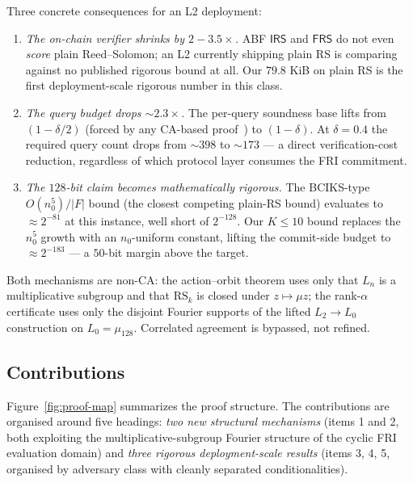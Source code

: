 \documentclass[11pt]{article}
\theoremstyle{definition}
\theoremstyle{remark}
\newcommand{\RS}{\mathrm{RS}}
\begin{document}
Three concrete consequences for an L2 deployment:
\begin{enumerate}[label=(\roman*), leftmargin=2em, nosep]
\item \emph{The on-chain verifier shrinks by $2{-}3.5\times$.} ABF
$\mathsf{IRS}$ and $\mathsf{FRS}$ do not even \emph{score} plain
Reed--Solomon; an L2 currently shipping plain RS is comparing against
no published rigorous bound at all. Our $79.8$ KiB on plain RS is the
first deployment-scale rigorous number in this class.
\item \emph{The query budget drops $\sim 2.3\times$.} The per-query
soundness base lifts from $(1{-}\delta/2)$ (forced by any CA-based
proof~\cite{Paper1}) to $(1{-}\delta)$. At $\delta = 0.4$ the required
query count drops from ${\sim}398$ to ${\sim}173$ --- a direct
verification-cost reduction, regardless of which protocol layer
consumes the FRI commitment.
\item \emph{The $128$-bit claim becomes mathematically rigorous.} The
BCIKS-type $O(n_0^5)/|F|$ bound (the closest competing plain-RS
bound) evaluates to $\approx 2^{-81}$ at this instance, well short of
$2^{-128}$. Our $K \leq 10$ bound replaces the $n_0^5$ growth with an
$n_0$-uniform constant, lifting the commit-side budget to
$\approx 2^{-183}$ --- a $50$-bit margin above the target.
\end{enumerate}

Both mechanisms are non-CA: the action--orbit theorem uses only that
$L_n$ is a multiplicative subgroup and that $\RS_k$ is closed under
$z \mapsto \mu z$; the rank-$\alpha$ certificate uses only the
disjoint Fourier supports of the lifted $L_2 \to L_0$ construction
on $L_0 = \mu_{128}$. Correlated agreement is bypassed, not refined.

\subsection{Contributions}
\label{ssec:contributions}

Figure~\ref{fig:proof-map} summarizes the proof structure. The
contributions are organised around five headings: \emph{two new
structural mechanisms} (items 1 and 2, both exploiting the
multiplicative-subgroup Fourier structure of the cyclic FRI evaluation
domain) and \emph{three rigorous deployment-scale results} (items 3, 4,
5, organised by adversary class with cleanly separated conditionalities).
\end{document}
